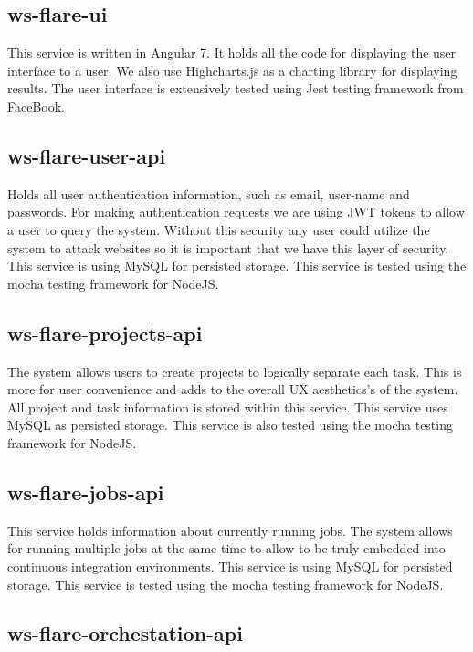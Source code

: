 \subsection{ws-flare-ui}

This service is written in Angular 7. It holds all the code for displaying the user interface to a user. We also use Highcharts.js as a charting library for displaying results. The user interface is extensively tested using Jest testing framework from FaceBook.

\subsection{ws-flare-user-api}

Holds all user authentication information, such as email, user-name and passwords. For making authentication requests we are using JWT tokens to allow a user to query the system. Without this security any user could utilize the system to attack websites so it is important that we have this layer of security. This service is using MySQL for persisted storage. This service is tested using the mocha testing framework for NodeJS.

\subsection{ws-flare-projects-api}

The system allows users to create projects to logically separate each task. This is more for user convenience and adds to the overall UX aesthetics's of the system. All project and task information is stored within this service. This service uses MySQL as persisted storage. This service is also tested using the mocha testing framework for NodeJS.

\subsection{ws-flare-jobs-api}

This service holds information about currently running jobs. The system allows for running multiple jobs at the same time to allow to be truly embedded into continuous integration environments. This service is using MySQL for persisted storage. This service is tested using the mocha testing framework for NodeJS.

\subsection{ws-flare-orchestation-api}

